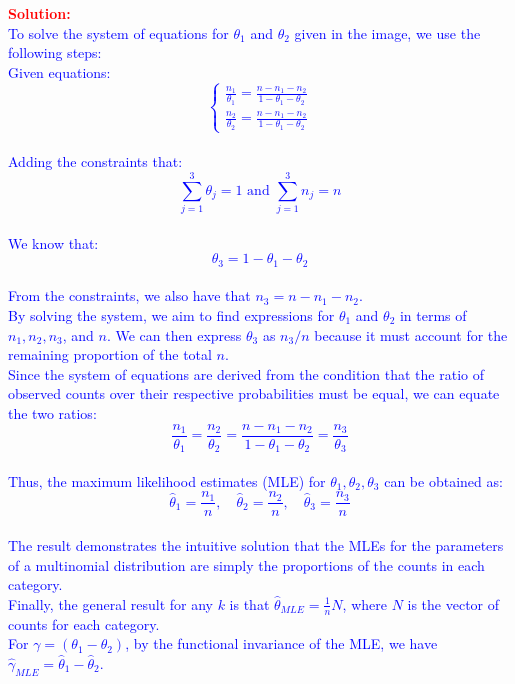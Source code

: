 \documentclass[12pt]{article}
\begin{document}
\begin{itemize}
\begin{itemize}
\begin{itemize}
\textcolor{red}{\textbf{Solution:}} \\
\textcolor{blue}{To solve the system of equations for \( \theta_1 \) and \( \theta_2 \) given in the image, we use the following steps:
\\
Given equations:
\[
\begin{cases}
\frac{n_1}{\theta_1} = \frac{n - n_1 - n_2}{1 - \theta_1 - \theta_2} \\
\frac{n_2}{\theta_2} = \frac{n - n_1 - n_2}{1 - \theta_1 - \theta_2}
\end{cases}
\]
\\
Adding the constraints that:
\[
\sum_{j=1}^{3} \theta_j = 1 \text{ and } \sum_{j=1}^{3} n_j = n
\]
\\
We know that:
\[
\theta_3 = 1 - \theta_1 - \theta_2
\]
\\
From the constraints, we also have that \( n_3 = n - n_1 - n_2 \).
\\
By solving the system, we aim to find expressions for \( \theta_1 \) and \( \theta_2 \) in terms of \( n_1, n_2, n_3 \), and \( n \). We can then express \( \theta_3 \) as \( n_3 / n \) because it must account for the remaining proportion of the total \( n \).
\\
Since the system of equations are derived from the condition that the ratio of observed counts over their respective probabilities must be equal, we can equate the two ratios:
\\
\[
\frac{n_1}{\theta_1} = \frac{n_2}{\theta_2} = \frac{n - n_1 - n_2}{1 - \theta_1 - \theta_2} = \frac{n_3}{\theta_3}
\]
\\
Thus, the maximum likelihood estimates (MLE) for \( \theta_1, \theta_2, \theta_3 \) can be obtained as:
\[
\hat{\theta}_1 = \frac{n_1}{n}, \quad \hat{\theta}_2 = \frac{n_2}{n}, \quad \hat{\theta}_3 = \frac{n_3}{n}
\]
\\
The result demonstrates the intuitive solution that the MLEs for the parameters of a multinomial distribution are simply the proportions of the counts in each category.
\\
Finally, the general result for any \( k \) is that \( \hat{\theta}_{MLE} = \frac{1}{n} N \), where \( N \) is the vector of counts for each category.
\\
For \( \gamma = (\theta_1 - \theta_2) \), by the functional invariance of the MLE, we have \( \hat{\gamma}_{MLE} = \hat{\theta}_1 - \hat{\theta}_2 \).}

\end{itemize}


\end{itemize}
\end{itemize}
\end{document}
